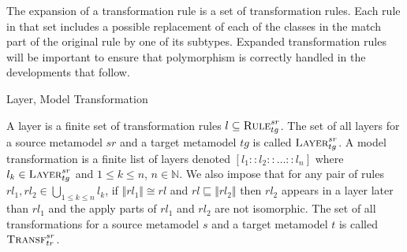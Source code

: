 
The expansion of a transformation rule is a set of transformation rules. Each rule in that set includes a possible replacement of each of the classes in the match part of the original rule by one of its subtypes. Expanded transformation rules will be important to ensure that polymorphism is correctly handled in the developments that follow.  
 


\begin{definition}{Layer, Model Transformation\\}
\label{def:layer_transformation}

A layer is a finite set of transformation rules $l\subseteq \textsc{Rule}^{sr}_{tg}$. The set of all layers for a source metamodel $sr$ and a target metamodel $tg$  is called $\textsc{Layer}^{sr}_{tg}$. A model transformation is a finite list of layers denoted $[l_{1}::l_{2}::\ldots::l_{n}]$ where $l_{k}\in \textsc{Layer}^{sr}_{tg}$ and $1\leq k \leq n$, $n\in \mathbb{N}$. We also impose that for any pair of rules $rl_1,rl_2\in \bigcup_{1\leq k\leq n}l_k$, if $\Vert rl_1\Vert \cong rl$ and $rl\sqsubseteq \Vert rl_2\Vert $ then $rl_2$ appears in a layer later than $rl_1$ and the apply parts of $rl_1$ and $rl_2$ are not isomorphic. The set of all transformations for a source metamodel $s$ and a target metamodel $t$ is called $\textsc{Transf}^{sr}_{tr}$. 


\end{definition}



